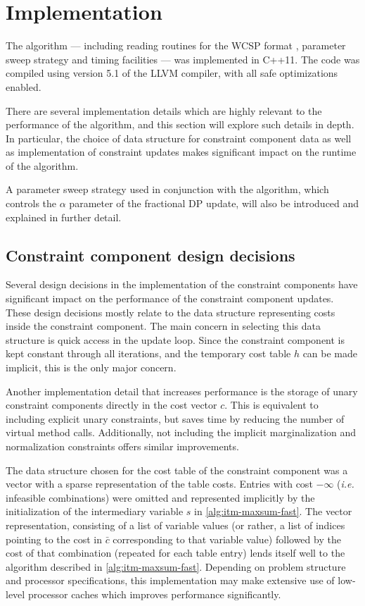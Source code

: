\section{Implementation}
The algorithm --- including reading routines for the WCSP format \parencite{wcspformat}, parameter sweep strategy and timing facilities --- was implemented in C++11.
The code was compiled using version 5.1 of the LLVM compiler, with all safe optimizations enabled.

There are several implementation details which are highly relevant to the performance of the algorithm, and this section will explore such details in depth.
In particular, the choice of data structure for constraint component data as well as implementation of constraint updates makes significant impact on the runtime of the algorithm.

A parameter sweep strategy used in conjunction with the algorithm, which controls the \(\alpha\) parameter of the fractional DP update, will also be introduced and explained in further detail.

\subsection{Constraint component design decisions}
Several design decisions in the implementation of the constraint components have significant impact on the performance of the constraint component updates.
These design decisions mostly relate to the data structure representing costs inside the constraint component.
The main concern in selecting this data structure is quick access in the update loop.
Since the constraint component is kept constant through all iterations, and the temporary cost table \(h\) can be made implicit, this is the only major concern.

Another implementation detail that increases performance is the storage of unary constraint components directly in the cost vector \(c\).
This is equivalent to including explicit unary constraints, but saves time by reducing the number of virtual method calls.
Additionally, not including the implicit marginalization and normalization constraints \parencite[\pno~12]{Wedelin13} offers similar improvements.

The data structure chosen for the cost table of the constraint component was a vector with a sparse representation of the table costs.
Entries with cost \(-\infty\) (\emph{i.e.} infeasible combinations) were omitted and represented implicitly by the initialization of the intermediary variable \(s\) in \cref{alg:itm-maxsum-fast}.
The vector representation, consisting of a list of variable values (or rather, a list of indices pointing to the cost in \(\bar{c}\) corresponding to that variable value) followed by the cost of that combination (repeated for each table entry) lends itself well to the algorithm described in \cref{alg:itm-maxsum-fast}.
Depending on problem structure and processor specifications, this implementation may make extensive use of low-level processor caches which improves performance significantly.

